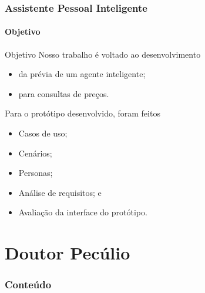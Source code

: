 \documentclass[14pt,beamer]{beamer}
\begin{document}
\begin{frame}
	\frametitle{Assistente Pessoal Inteligente}
    \framesubtitle{Objetivo}

    \begin{block}{Objetivo}
        Nosso trabalho é voltado ao desenvolvimento 
        \begin{itemize}
            \item da prévia de um agente inteligente;
            \item para consultas de preços.
        \end{itemize}
        Para o protótipo desenvolvido, foram feitos
        \begin{itemize}
            \item Casos de uso;
            \item Cenários;
            \item Personas;
            \item Análise de requisitos; e
            \item Avaliação da interface do protótipo.
        \end{itemize}
    \end{block}
\end{frame}

\section{Doutor Pecúlio}

\begin{frame}
	\frametitle{Conteúdo}
    \begin{multicols}{2}
        \small
    \end{multicols}
\end{frame}
\end{document}
